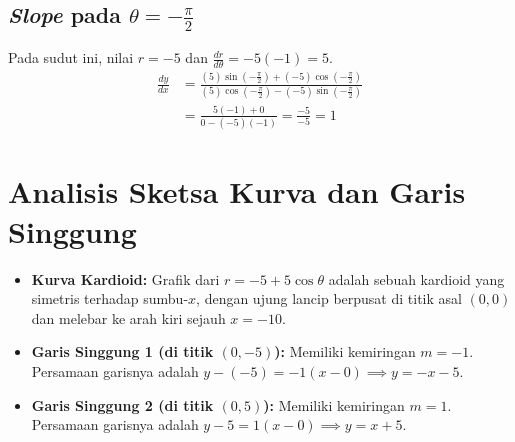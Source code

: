 \documentclass[11pt,a4paper]{article}
\begin{document}
\subsection{\textit{Slope} pada $\theta = -\frac{\pi}{2}$}
Pada sudut ini, nilai $r = -5$ dan $\frac{dr}{d\theta} = -5(-1) = 5$.
\begin{align*}
  \frac{dy}{dx} &= \frac{(5)\sin(-\frac{\pi}{2}) + (-5)\cos(-\frac{\pi}{2})}{(5)\cos(-\frac{\pi}{2}) - (-5)\sin(-\frac{\pi}{2})} \\
  &= \frac{5(-1) + 0}{0 - (-5)(-1)} = \frac{-5}{-5} = 1
\end{align*}

\section{Analisis Sketsa Kurva dan Garis Singgung}
\begin{itemize}
  \item \textbf{Kurva Kardioid:} Grafik dari $r = -5 + 5\cos\theta$ adalah sebuah kardioid yang simetris terhadap sumbu-$x$, dengan ujung lancip berpusat di titik asal $(0,0)$ dan melebar ke arah kiri sejauh $x = -10$.
  \item \textbf{Garis Singgung 1 (di titik $(0,-5)$):} Memiliki kemiringan $m = -1$. Persamaan garisnya adalah $y - (-5) = -1(x - 0) \implies y = -x - 5$.
  \item \textbf{Garis Singgung 2 (di titik $(0,5)$):} Memiliki kemiringan $m = 1$. Persamaan garisnya adalah $y - 5 = 1(x - 0) \implies y = x + 5$.
\end{itemize}
\end{document}
